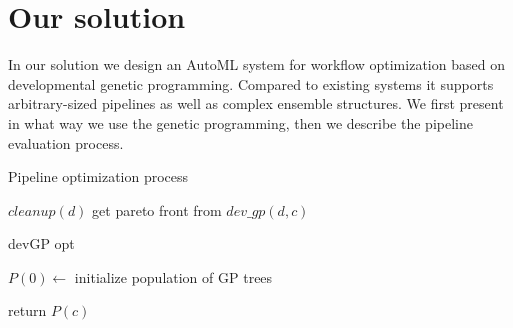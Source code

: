 \chapter{Our solution} \label{our:solution}

In our solution we design an AutoML system for workflow optimization based on
developmental genetic programming. Compared to existing systems it supports 
arbitrary-sized pipelines as well as complex ensemble structures. We first
present in what way we use the genetic programming, then we describe the
pipeline evaluation process.


\begin{algorithm}
\DontPrintSemicolon 
\caption{Pipeline optimization process\label{alg:genens}}
  \;
  $cleanup(d)$
  \;
  get pareto front from $dev\_gp(d, c)$
\end{algorithm}


\begin{algorithm}
\DontPrintSemicolon 
\caption{devGP opt}
  \SetNoFillComment
  \;
  $P(0) \longleftarrow$ initialize population of GP trees

  \;
  return $P(c)$  
\end{algorithm}





